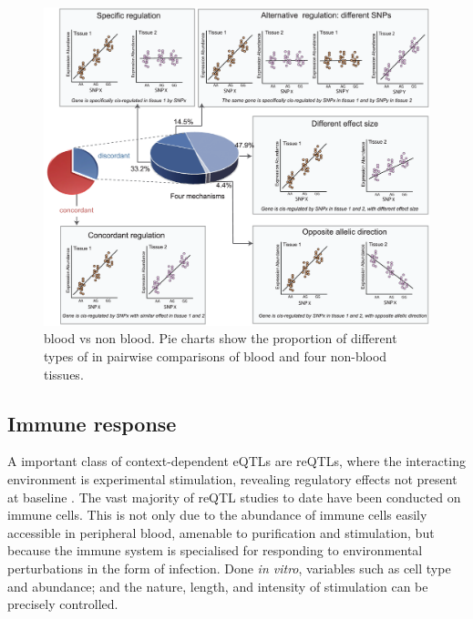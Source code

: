 \begin{outline}
\begin{figure}
    \centering
    \includegraphics[width=1.0\textwidth,page=1]{mainmatter/figures/chapter_01/journal.pgen.1002431.g002.png}
    \caption{blood vs non blood. Pie charts show the proportion of different types of in pairwise comparisons of blood and four non-blood tissues.}
    \label{fig:intro_reQTLmechs}
\end{figure}

\subsection{Immune response }
\label{subsec:intro_reQTL}

A important class of context-dependent \glspl{eQTL} are \glspl{reQTL}, 
where the interacting environment is experimental stimulation,
revealing regulatory effects not present at baseline \autocite{vandiedonck2017GeneticAssociationMolecular,huang2019GeneticsGeneExpression}.
The vast majority of \gls{reQTL} studies to date have been conducted on immune cells. 
This is not only due to the abundance of immune cells easily accessible in peripheral blood, amenable to purification and stimulation,
but because the immune system is specialised for responding to environmental perturbations in the form of infection.
Done \textit{in vitro}, variables such as cell type and abundance; and the nature, length, and intensity of stimulation can be precisely controlled.


\end{outline}
